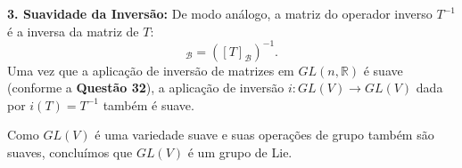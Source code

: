 {	\textbf{3. Suavidade da Inversão:}
	De modo análogo, a matriz do operador inverso $T^{-1}$ é a inversa da matriz de $T$:
	\begin{equation*}
		[T^{-1}]_{\mathcal{B}} = ([T]_{\mathcal{B}})^{-1}.
	\end{equation*}
	Uma vez que a aplicação de inversão de matrizes em $GL(n, \mathbb{R})$ é suave (conforme a \textbf{Questão 32}), a aplicação de inversão $i : GL(V) \to GL(V)$ dada por $i(T) = T^{-1}$ também é suave.
	
	Como $GL(V)$ é uma variedade suave e suas operações de grupo também são suaves, concluímos que $GL(V)$ é um grupo de Lie.
}
